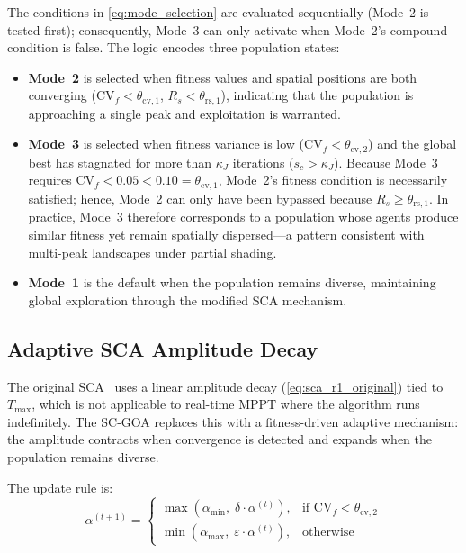 \documentclass[a4paper, 12pt]{article}
\begin{document}
The conditions in \cref{eq:mode_selection} are evaluated sequentially (Mode~2 is tested first); consequently, Mode~3 can only activate when Mode~2's compound condition is false. The logic encodes three population states:
\begin{itemize}
    \item \textbf{Mode~2} is selected when fitness values and spatial positions are both converging ($\mathrm{CV}_f < \theta_{\mathrm{cv},1}$, $R_s < \theta_{\mathrm{rs},1}$), indicating that the population is approaching a single peak and exploitation is warranted.
    \item \textbf{Mode~3} is selected when fitness variance is low ($\mathrm{CV}_f < \theta_{\mathrm{cv},2}$) and the global best has stagnated for more than $\kappa_J$ iterations ($s_c > \kappa_J$). Because Mode~3 requires $\mathrm{CV}_f < 0.05 < 0.10 = \theta_{\mathrm{cv},1}$, Mode~2's fitness condition is necessarily satisfied; hence, Mode~2 can only have been bypassed because $R_s \geq \theta_{\mathrm{rs},1}$. In practice, Mode~3 therefore corresponds to a population whose agents produce similar fitness yet remain spatially dispersed---a pattern consistent with multi-peak landscapes under partial shading.
    \item \textbf{Mode~1} is the default when the population remains diverse, maintaining global exploration through the modified SCA mechanism.
\end{itemize}


\subsection{Adaptive SCA Amplitude Decay}
\label{subsec:alpha_decay}

The original SCA~\cite{mirjalili2016sca} uses a linear amplitude decay (\cref{eq:sca_r1_original}) tied to $T_{\max}$, which is not applicable to real-time MPPT where the algorithm runs indefinitely. The SC-GOA replaces this with a fitness-driven adaptive mechanism: the amplitude contracts when convergence is detected and expands when the population remains diverse.

The update rule is:
\begin{equation}
    \alpha^{(t+1)} =
    \begin{cases}
        \max\!\left(\alpha_{\min},\; \delta \cdot \alpha^{(t)}\right), & \text{if } \mathrm{CV}_f < \theta_{\mathrm{cv},2} \\[4pt]
        \min\!\left(\alpha_{\max},\; \varepsilon \cdot \alpha^{(t)}\right), & \text{otherwise}
    \end{cases}
    \label{eq:alpha_decay}
\end{equation}
\end{document}

